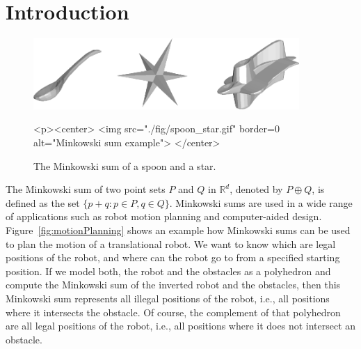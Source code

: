 
\ccParDims


%

\section{Introduction}

\begin{figure}[h]
  \begin{ccTexOnly}
    \begin{center}
      \includegraphics[width=0.9\textwidth]{Minkowski_sum_3/fig/spoon_star}
    \end{center}
  \end{ccTexOnly}
  \begin{ccHtmlOnly}
    <p><center>
    <img src="./fig/spoon_star.gif" border=0 alt="Minkowski sum example">
    </center>
  \end{ccHtmlOnly}
  \caption{The Minkowski sum of a spoon and a star.}
\end{figure}

The Minkowski sum of two point sets $P$ and $Q$ in $\mathbb{R}^d$, denoted by
$P \oplus Q$, is defined as the set $\{p+q:p \in P, q \in Q
\}$. Minkowski sums are used in a wide range of applications such as
robot motion planning and computer-aided
design. Figure~\ref{fig:motionPlanning} shows an example how Minkowski
sums can be used to plan the motion of a translational robot. We want
to know which are legal positions of the robot, and where can the
robot go to from a specified starting position. If we model both, the
robot and the obstacles as a polyhedron and compute the Minkowski sum
of the inverted robot and the obstacles, then this Minkowski sum
represents all illegal positions of the robot, i.e., all positions
where it intersects the obstacle. Of course, the complement of that
polyhedron are all legal positions of the robot, i.e., all positions
where it does not intersect an obstacle.

